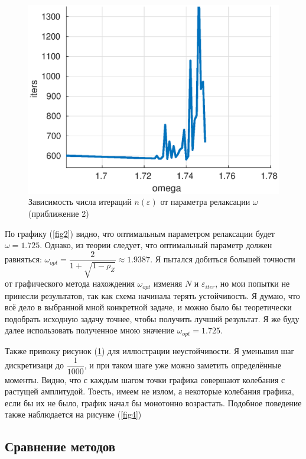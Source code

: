 \documentclass[12pt]{article}
\begin{document}
\begin{figure}[H]
\centerline{\includegraphics[scale = 0.8]{sor3.eps}}
\caption{Зависимость числа итераций $n(\varepsilon)$ от параметра релаксации $\omega$ (приближение 2)}
\label{fig3}
\end{figure} 

По графику (\ref{fig2}) видно, что оптимальным параметром релаксации будет $\omega = 1.725$. Однако, из теории следует, что оптимальный параметр должен равняться: $\omega_{opt} = \dfrac{2}{1+\sqrt{1 - \rho_{Z}}} \approx 1.9387$. Я пытался добиться большей точности от графического метода нахождения $\omega_{opt}$ изменяя $N$ и $\varepsilon_{iter}$, но мои попытки не принесли результатов, так как схема начинала терять устойчивость. Я думаю, что всё дело в выбранной мной конкретной задаче, и можно было бы теоретически подобрать исходную задачу точнее, чтобы получить лучший результат. Я же буду далее использовать полученное мною значение $\omega_{opt} = 1.725$.

Также привожу рисунок (\ref{fig3}) для иллюстрации неустойчивости. Я уменьшил шаг дискретизаци до $\dfrac{1}{1000}$, и при таком шаге уже можно заметить определённые моменты. Видно, что с каждым шагом точки графика совершают колебания с растущей амплитудой. Тоесть, имеем не излом, а некоторые колебания графика, если бы их не было, график начал бы монотонно возрастать. Подобное поведение также наблюдается на рисунке (\ref{fig4})
\subsection{Сравнение методов}
\end{document}
